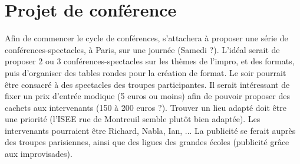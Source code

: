 \documentclass[a4paper,french,10pt]{article}
\begin{document}
\section{Projet de conférence}
Afin de commencer le cycle de conférences, \meta{} s'attachera à proposer une série de conférences-spectacles, à Paris, sur une journée (Samedi ?). L'idéal serait de proposer 2 ou 3 conférences-spectacles sur les thèmes de l'impro, et des formats, puis d'organiser des tables rondes pour la création de format. Le soir pourrait être consacré à des spectacles des troupes participantes. Il serait intéressant de fixer un prix d'entrée modique (5 euros ou moins) afin de pouvoir proposer des cachets aux intervenants (150 à 200 euros ?).
Trouver un lieu adapté doit être une priorité (l'ISEE rue de Montreuil semble plutôt bien adaptée). Les intervenants pourraient être Richard, Nabla, Ian, ...
La publicité se ferait auprès des troupes parisiennes, ainsi que des ligues des grandes écoles (publicité grâce aux improvisades).
\end{document}
